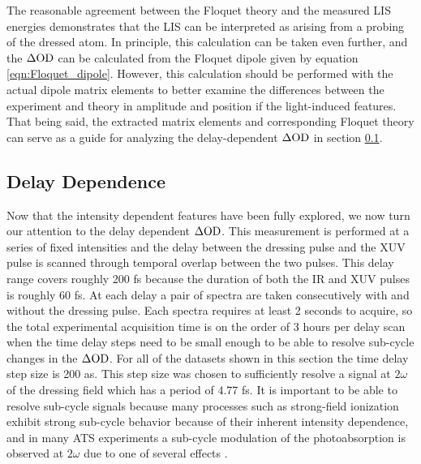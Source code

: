 The reasonable agreement between the Floquet theory and the measured LIS energies demonstrates that the LIS can be interpreted as arising from a probing of the dressed atom.  In principle, this calculation can be taken even further, and the $\Delta\mathrm{OD}$ can be calculated from the Floquet dipole given by equation \ref{eqn:Floquet_dipole}. However, this calculation should be performed with the actual dipole matrix elements to better examine the differences between the experiment and theory in amplitude and position if the light-induced features.  That being said, the extracted matrix elements and corresponding Floquet theory can serve as a guide for analyzing the delay-dependent $\Delta\mathrm{OD}$ in section \ref{sec:ATS_ar_delay}.

\subsection{Delay Dependence}
\label{sec:ATS_ar_delay}

Now that the intensity dependent features have been fully explored, we now turn our attention to the delay dependent $\Delta\mathrm{OD}$. This measurement is performed at a series of fixed intensities and the delay between the dressing pulse and the XUV pulse is scanned through temporal overlap between the two pulses. This delay range covers roughly 200 fs because the duration of both the IR and XUV pulses is roughly 60 fs.  At each delay a pair of spectra are taken consecutively with and without the dressing pulse.  Each spectra requires at least 2 seconds to acquire, so the total experimental acquisition time is on the order of 3 hours per delay scan when the time delay steps need to be small enough to be able to resolve sub-cycle changes in the $\Delta\mathrm{OD}$.  For all of the datasets shown in this section the time delay step size is 200 as.  This step size was chosen to sufficiently resolve a signal at $2\omega$ of the dressing field which has a period of 4.77 fs.  It is important to be able to resolve sub-cycle signals because many processes such as strong-field ionization exhibit strong sub-cycle behavior because of their inherent intensity dependence, and in many ATS experiments a sub-cycle modulation of the photoabsorption is observed at $2\omega$ due to one of several effects \cite{wuTheoryStrongfieldAttosecond2016, chiniSubcycleAcStark2012, chiniSubcycleOscillationsVirtual2013, reduzziPolarizationControlAbsorption2015, ottReconstructionControlTimedependent2014, argentiDressingEffectsAttosecond2015, kaldunExtractingPhaseAmplitude2014}.

